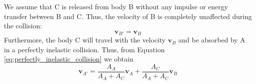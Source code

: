 \documentclass{article}
\newcommand{\vbs}[0]{\boldsymbol{v}}
\begin{document}
We assume that C is released from body B without any impulse or energy transfer between B and C. Thus, the velocity of B is completely unaffected during the collision:
\begin{equation}
\vbs_{B'} = \vbs_B
\end{equation}
Furthermore, the body C will travel with the velocity $\vbs_B$ and be absorbed by A in a perfectly inelastic collision. Thus, from Equation \ref{eq:perfectly_inelastic_collision} we obtain
\begin{equation}
\vbs_{A'} = \frac{A_A}{A_A + A_C}\vbs_A + \frac{A_C}{A_A + A_C}\vbs_B
\end{equation}
\end{document}
